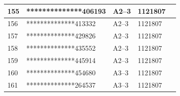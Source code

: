 \documentclass[UTF8,10pt,a4paper,fontset=fandol]{ctexart}
\newcommand{\fieldvalue}[1]{#1}
\begin{document}
\begin{center}
\begin{tabular}{|p{1.0cm}|p{3.8cm}|p{2.3cm}|p{2.8cm}|p{2.2cm}|}
\fieldvalue{155} &
\fieldvalue{**************406193} &
\fieldvalue{A2--3} &
\fieldvalue{1121807} & \\ \hline
\fieldvalue{156} &
\fieldvalue{**************413332} &
\fieldvalue{A2--3} &
\fieldvalue{1121807} & \\ \hline
\fieldvalue{157} &
\fieldvalue{**************429826} &
\fieldvalue{A2--3} &
\fieldvalue{1121807} & \\ \hline
\fieldvalue{158} &
\fieldvalue{**************435552} &
\fieldvalue{A2--3} &
\fieldvalue{1121807} & \\ \hline
\fieldvalue{159} &
\fieldvalue{**************445914} &
\fieldvalue{A2--3} &
\fieldvalue{1121807} & \\ \hline
\fieldvalue{160} &
\fieldvalue{**************454680} &
\fieldvalue{A3--3} &
\fieldvalue{1121807} & \\ \hline
\fieldvalue{161} &
\fieldvalue{**************264537} &
\fieldvalue{A3--3} &
\fieldvalue{1121807} & \\ \hline

\end{tabular}
\end{center}
\end{document}
